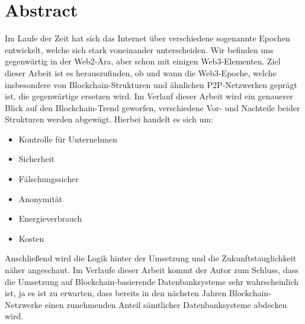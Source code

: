 \newpage

\chapter*{Abstract}

Im Laufe der Zeit hat sich das Internet über verschiedene sogenannte Epochen entwickelt, welche sich stark voneinander unterscheiden.
Wir befinden uns gegenwärtig in der Web2-Ära, aber schon mit einigen Web3-Elementen.
Ziel dieser Arbeit ist es herauszufinden, ob und wann die Web3-Epoche, welche insbesondere von Blockchain-Strukturen und ähnlichen P2P-Netzwerken geprägt ist, die gegenwärtige ersetzen wird.
Im Verlauf dieser Arbeit wird ein genauerer Blick auf den Blockchain-Trend geworfen, verschiedene Vor- und Nachteile beider Strukturen werden abgewägt.
Hierbei handelt es sich um:
\begin{itemize}
    \item Kontrolle für Unternehmen
    \item Sicherheit
    \item Fälschungssicher
    \item Anonymität
    \item Energieverbrauch
    \item Kosten
\end{itemize}
Anschließend wird die Logik hinter der Umsetzung und die Zukunftstauglichkeit näher angeschaut.
Im Verlaufe dieser Arbeit kommt der Autor zum Schluss, dass die Umsetzung auf Blockchain-basierende Datenbanksysteme sehr wahrscheinlich ist, ja es ist zu erwarten, dass bereits in den nächsten Jahren Blockchain-Netzwerke einen zunehmenden Anteil sämtlicher Datenbanksysteme abdecken wird.